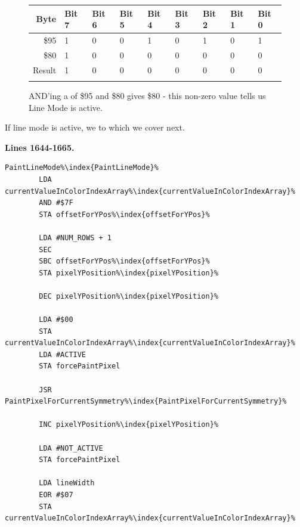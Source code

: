 \begin{figure}[H]
  {
    \setlength{\tabcolsep}{3.0pt}
    \setlength\cmidrulewidth{\heavyrulewidth} %
    \begin{adjustbox}{width=7cm,center}

      \begin{tabular}{rllllllll}
        \toprule
        Byte & Bit 7 & Bit 6 & Bit 5 & Bit 4 & Bit 3 & Bit 2 & Bit 1 & Bit 0        \\
        \midrule
        \$95 & 1 & 0 & 0 & 1 & 0 & 1 & 0 & 1 \\
        \$80 & 1 & 0 & 0 & 0 & 0 & 0 & 0 & 0 \\
        \midrule
      Result & 1 & 0 & 0 & 0 & 0 & 0 & 0 & 0 \\
        \addlinespace
        \bottomrule
      \end{tabular}

    \end{adjustbox}

  }\caption*{AND'ing a  of \$95 and \$80 gives \$80 - this non-zero value tells us Line Mode is active.}
\end{figure}

If line mode is active, we  to  which we cover next.

\clearpage
\textbf{Lines 1644-1665. } 
\begin{lstlisting}[caption=From \icode{PaintLineMode\index{PaintLineMode}}.,escapechar=\%]
PaintLineMode%\index{PaintLineMode}% 
        LDA currentValueInColorIndexArray%\index{currentValueInColorIndexArray}%
        AND #$7F
        STA offsetForYPos%\index{offsetForYPos}%

        LDA #NUM_ROWS + 1
        SEC 
        SBC offsetForYPos%\index{offsetForYPos}%
        STA pixelYPosition%\index{pixelYPosition}%

        DEC pixelYPosition%\index{pixelYPosition}%

        LDA #$00
        STA currentValueInColorIndexArray%\index{currentValueInColorIndexArray}%
        LDA #ACTIVE
        STA forcePaintPixel

        JSR PaintPixelForCurrentSymmetry%\index{PaintPixelForCurrentSymmetry}%

        INC pixelYPosition%\index{pixelYPosition}%

        LDA #NOT_ACTIVE
        STA forcePaintPixel

        LDA lineWidth
        EOR #$07
        STA currentValueInColorIndexArray%\index{currentValueInColorIndexArray}%
\end{lstlisting}
\clearpage

